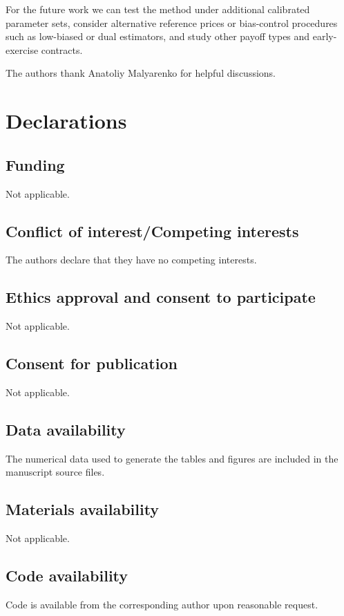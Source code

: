 \documentclass[pdflatex,sn-mathphys-num]{sn-jnl}
\theoremstyle{thmstyleone}%
\theoremstyle{thmstylethree}%
\theoremstyle{thmstyletwo}%
\begin{document}
For the future work we can test the method under additional calibrated parameter sets, consider alternative reference prices or bias-control procedures such as low-biased or dual estimators, and study other payoff types and early-exercise contracts.



\backmatter

The authors thank Anatoliy Malyarenko for helpful discussions.

\section*{Declarations}

\subsection*{Funding}
Not applicable.

\subsection*{Conflict of interest/Competing interests}
The authors declare that they have no competing interests.

\subsection*{Ethics approval and consent to participate}
Not applicable.

\subsection*{Consent for publication}
Not applicable.

\subsection*{Data availability}
The numerical data used to generate the tables and figures are included in the manuscript source files.

\subsection*{Materials availability}
Not applicable.

\subsection*{Code availability}
Code is available from the corresponding author upon reasonable request.
\end{document}
